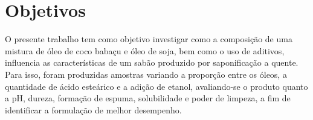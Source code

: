 \section{Objetivos}

O presente trabalho tem como objetivo investigar como a composição de uma mistura de óleo de coco babaçu e óleo de soja, bem como o uso de aditivos, influencia as características de um sabão produzido por saponificação a quente. Para isso, foram produzidas amostras variando a proporção entre os óleos, a quantidade de ácido esteárico e a adição de etanol, avaliando-se o produto quanto a pH, dureza, formação de espuma, solubilidade e poder de limpeza, a fim de identificar a formulação de melhor desempenho.
